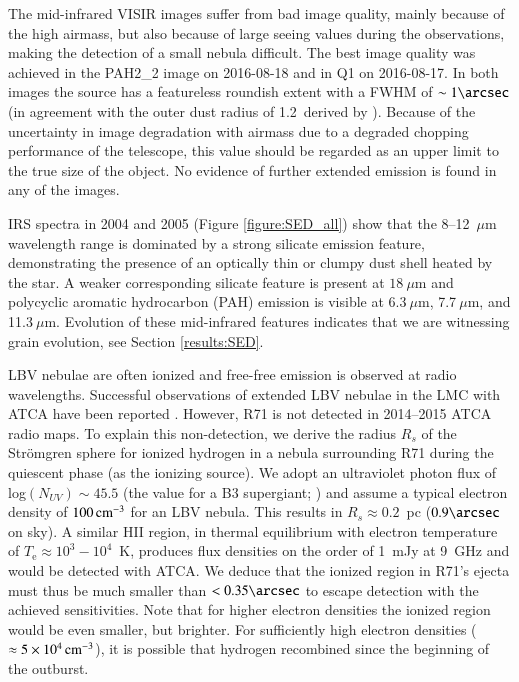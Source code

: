 \documentclass[structabstract]{aa}
\begin{document}
The mid-infrared VISIR images suffer from bad image quality, mainly because of the high airmass, but also because of large seeing values during the observations, making the detection of a small nebula difficult. The best image quality was achieved in the PAH2\_2 image on 2016-08-18 and in Q1 on 2016-08-17. In both images the source has a featureless roundish extent with a FWHM of $\sim 1\arcsec$ (in agreement with the outer dust radius of 1.2\arcsec\ derived by \citealt{2014A&A...569A..80G}). Because of the uncertainty in image degradation with airmass due to a degraded chopping performance of the telescope, this value should be regarded as an upper limit to the true size of the object. No evidence of further extended emission is found in any of the images.

IRS spectra in 2004 and 2005 (Figure \ref{figure:SED_all}) show that the 8--12~$\mu$m wavelength range is dominated by a strong silicate emission feature, demonstrating the presence of an optically thin or clumpy dust shell heated by the star. A weaker corresponding silicate feature is present at $18~\mu$m and polycyclic aromatic hydrocarbon (PAH) emission is visible at 6.3$~\mu$m, 7.7$~\mu$m, and 11.3$~\mu$m. Evolution of these mid-infrared features indicates that we are witnessing grain evolution, see Section \ref{results:SED}.

LBV nebulae are often ionized and free-free emission is observed at radio wavelengths. Successful observations of extended LBV nebulae in the LMC with ATCA have been reported \citep{2012MNRAS.426..181A}. However, R71 is not detected in 2014--2015 ATCA radio maps. To explain this non-detection, we derive the radius $R_{s}$ of the Str{\"o}mgren sphere for ionized hydrogen in a nebula surrounding R71 during the quiescent phase (as the ionizing source). We adopt an ultraviolet photon flux of log$(N_{UV}) \sim 45.5$ (the value for a B3 supergiant; \citealt{1973AJ.....78..929P}) and assume a typical electron density of $100\,\rm cm^{-3}$ for an LBV nebula. This results in $R_{s}\approx0.2$~pc ($0.9\arcsec$ on sky). A similar HII region, in thermal equilibrium with electron temperature of $T_\mathrm{e}\approx 10^{3}-10^{4}$~K, produces flux densities on the order of 1~mJy at 9~GHz and would be detected with ATCA. We deduce that the ionized region in R71's ejecta must thus be much smaller than $<0.35\arcsec$ to escape detection with the achieved sensitivities. Note that for higher electron densities the ionized region would be even smaller, but brighter. For sufficiently high electron densities ($\approx 5\times10^{4}\,\rm cm^{-3}$), it is possible that hydrogen recombined since the beginning of the outburst. 
\end{document}
